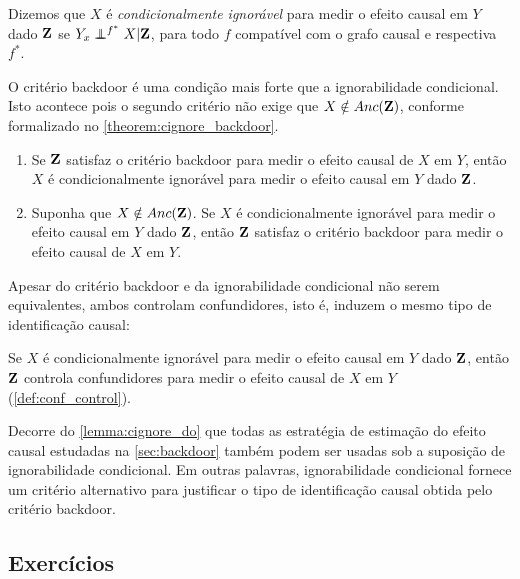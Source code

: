 \begin{definition}
 \label{def:cignore}
 Dizemos que $X$ é \textit{condicionalmente ignorável} para
 medir o efeito causal em $Y$ dado ${\mathbf{Z}}$ se
 $Y_x \perp\!\!\!\!\perp^{f^*} X | {\mathbf{Z}}$, 
 para todo $f$ compatível com o grafo causal e
 respectiva $f^*$.
\end{definition}

O critério backdoor é uma condição 
mais forte que a ignorabilidade condicional.
Isto acontece pois o segundo critério não exige que
$X \notin Anc({\mathbf{Z}})$, conforme 
formalizado no \cref{theorem:cignore_backdoor}.

\begin{theorem}
 \label{theorem:cignore_backdoor}
 \begin{enumerate}[label=(\roman*)]
  \item Se ${\mathbf{Z}}$ satisfaz o critério backdoor para 
  medir o efeito causal de $X$ em $Y$, então
  $X$ é condicionalmente ignorável para 
  medir o efeito causal em $Y$ dado ${\mathbf{Z}}$.
  \item Suponha que $X \notin Anc({\mathbf{Z}})$.
  Se $X$ é condicionalmente ignorável para 
  medir o efeito causal em $Y$ dado ${\mathbf{Z}}$, então
  ${\mathbf{Z}}$ satisfaz o critério backdoor para 
  medir o efeito causal de $X$ em $Y$.
 \end{enumerate}
\end{theorem}

Apesar do critério backdoor e
da ignorabilidade condicional não serem equivalentes,
ambos controlam confundidores, isto é,
induzem o mesmo tipo de identificação causal:

\begin{lemma}
 \label{lemma:cignore_do}
 Se $X$ é condicionalmente ignorável para 
 medir o efeito causal em $Y$ dado ${\mathbf{Z}}$, então
 ${\mathbf{Z}}$ controla confundidores para
 medir o efeito causal de $X$ em $Y$ (\cref{def:conf_control}).
\end{lemma}

Decorre do \cref{lemma:cignore_do} que
todas as estratégia de estimação do efeito causal
estudadas na \cref{sec:backdoor} também
podem ser usadas sob 
a suposição de ignorabilidade condicional.
Em outras palavras, 
ignorabilidade condicional fornece 
um critério alternativo para
justificar o tipo de identificação causal
obtida pelo critério backdoor. 

\subsection{Exercícios}


